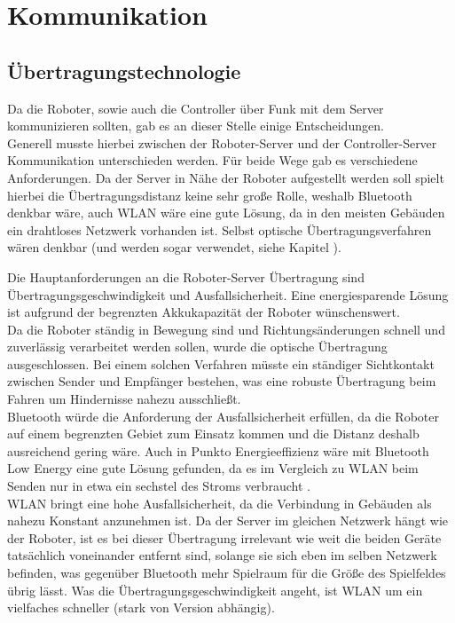 \section{Kommunikation}
\label{sec:kommunikation}

\subsection*{Übertragungstechnologie}
Da die Roboter, sowie auch die Controller über Funk mit dem Server kommunizieren sollten, gab es an dieser Stelle einige Entscheidungen. \\
Generell musste hierbei zwischen der Roboter-Server und der Controller-Server Kommunikation unterschieden werden. Für beide Wege gab es verschiedene Anforderungen. 
Da der Server in Nähe der Roboter aufgestellt werden soll spielt hierbei die Übertragungsdistanz keine sehr große Rolle, weshalb Bluetooth denkbar wäre, auch WLAN wäre eine gute Lösung, da in den meisten Gebäuden ein drahtloses Netzwerk vorhanden ist. Selbst optische Übertragungsverfahren wären denkbar (und werden sogar verwendet, siehe Kapitel %
).

Die Hauptanforderungen an die Roboter-Server Übertragung sind Übertragungsgeschwindigkeit und Ausfallsicherheit. Eine energiesparende Lösung ist aufgrund der begrenzten Akkukapazität der Roboter wünschenswert. \\
Da die Roboter ständig in Bewegung sind und Richtungsänderungen schnell und zuverlässig verarbeitet werden sollen, wurde die optische Übertragung ausgeschlossen. Bei einem solchen Verfahren müsste ein ständiger Sichtkontakt zwischen Sender und Empfänger bestehen, was eine robuste Übertragung beim Fahren um Hindernisse nahezu ausschließt. \\
 Bluetooth würde die Anforderung der Ausfallsicherheit erfüllen, da die Roboter auf einem begrenzten Gebiet zum Einsatz kommen und die Distanz deshalb ausreichend gering wäre. Auch in Punkto Energieeffizienz wäre mit Bluetooth Low Energy eine gute Lösung gefunden, da es im Vergleich zu WLAN beim Senden nur in etwa ein sechstel des Stroms verbraucht %
. \\
WLAN bringt eine hohe Ausfallsicherheit, da die Verbindung in Gebäuden als nahezu Konstant anzunehmen ist. Da der Server im gleichen Netzwerk hängt wie der Roboter, ist es bei dieser Übertragung irrelevant wie weit die beiden Geräte tatsächlich voneinander entfernt sind, solange sie sich eben im selben Netzwerk befinden, was gegenüber Bluetooth mehr Spielraum für die Größe des Spielfeldes übrig lässt. Was die Übertragungsgeschwindigkeit angeht, ist WLAN um ein vielfaches schneller (stark von Version abhängig). \\


